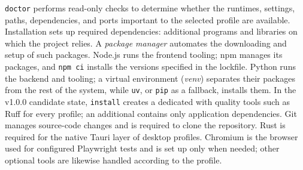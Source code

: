 \begin{beginnerstatement}

\texttt{doctor} performs read-only checks to determine whether the runtimes,
settings, paths, dependencies, and ports important to the selected profile are
available. Installation sets up required dependencies: additional programs
and libraries on which the project relies. A \emph{package manager} automates
the downloading and setup of such packages. Node.js runs the frontend
tooling; npm manages its packages, and \texttt{npm ci} installs the versions
specified in the lockfile. Python runs the backend and tooling; a virtual
environment (\emph{venv}) separates their packages from the rest of the
system, while \texttt{uv}, or \texttt{pip} as a fallback, installs them. In
the v1.0.0 candidate state, \texttt{install} creates a dedicated
 with quality tools such as Ruff for every profile; an
additional  contains only application dependencies. Git
manages source-code changes and is required to clone the repository. Rust is
required for the native Tauri layer of desktop profiles. Chromium is the
browser used for configured Playwright tests and is set up only when needed;
other optional tools are likewise handled according to the profile.

\end{beginnerstatement}

